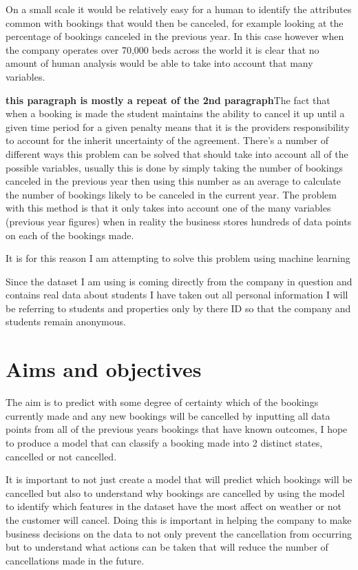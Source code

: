 \vspace{5mm}

On a small scale it would be relatively easy for a human to identify the attributes common with bookings that would then be canceled, for example looking at the percentage of bookings canceled in the previous year. In this case however when the company operates over 70,000 beds across the world it is clear that no amount of human analysis would be able to take into account that many variables. 

\vspace{5mm}

\textbf{this paragraph is mostly a repeat of the 2nd paragraph}The fact that when a booking is made the student maintains the ability to cancel it up until a given time period for a given penalty means that it is the providers responsibility to account for the inherit uncertainty of the agreement. There's a number of different ways this problem can be solved that should take into account all of the possible variables, usually this is done by simply taking the number of bookings canceled in the previous year then using this number as an average to calculate the number of bookings likely to be canceled in the current year. The problem with this method is that it only takes into account one of the many variables (previous year figures) when in reality the business stores hundreds of data points on each of the bookings made.

It is for this reason I am attempting to solve this problem using machine learning

Since the dataset I am using is coming directly from the company in question and contains real data about students I have taken out all personal information I will be referring to students and properties only by there ID so that the company and students remain anonymous. 
    
\section{Aims and objectives}
The aim is to predict with some degree of certainty which of the bookings currently made and any new bookings will be cancelled by inputting all data points from all of the previous years bookings that have known outcomes, I hope to produce a model that can classify a booking made into 2 distinct states, cancelled or not cancelled.

It is important to not just create a model that will predict which bookings will be cancelled but also to understand why bookings are cancelled by using the model to identify which features in the dataset have the most affect on weather or not the customer will cancel. Doing this is important in helping the company to make business decisions on the data to not only prevent the cancellation from occurring but to understand what actions can be taken that will reduce the number of cancellations made in the future.  

